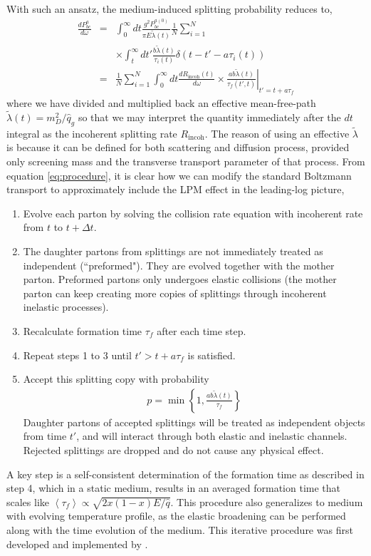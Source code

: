 \documentclass[aps, prc, reprint, amsmath, groupedaddress, nofootinbib]{revtex4-1}
\begin{document}
With such an ansatz, the medium-induced splitting probability reduces to,
\begin{eqnarray}
\nonumber
\frac{dP^{a}_{bc}}{d\omega} &=& \int_0^\infty dt \frac{g^2 P_{bc}^{a(0)}}{\pi E\tilde{\lambda}(t)} \frac{1}{N}\sum_{i=1}^N\\\nonumber
&&\times \int_t^\infty dt' \frac{b \tilde{\lambda}(t)}{\tau_i(t)} \delta(t-t'- a \tau_i(t)) \\
&=& \frac{1}{N}\sum_{i=1}^N\int_0^\infty dt \frac{dR_{\textrm{incoh}}(t)}{d\omega} \times \left.\frac{ab\tilde{\lambda}(t)}{\tau_f(t',t)}\right|_{t'=t+a\tau_f}
\label{eq:procedure}
\end{eqnarray}
where we have divided and multiplied back an effective mean-free-path $\tilde{\lambda}(t) = m_D^2/\hat{q}_g$ so that we may interpret the quantity immediately after the $dt$ integral as the incoherent splitting rate $R_{\textrm{incoh}}$.
The reason of using an effective $\tilde{\lambda}$ is because it can be defined for both scattering and diffusion process, provided only screening mass and the transverse transport parameter of that process.
From equation \ref{eq:procedure}, it is clear how we can modify the standard Boltzmann transport to approximately include the LPM effect in the leading-log picture,
\begin{enumerate}
\item Evolve each parton by solving the collision rate equation with incoherent rate from $t$ to $t+\Delta t$.
\item The daughter partons from splittings are not immediately treated as independent (``preformed"). They are evolved together with the mother parton. Preformed partons only undergoes elastic collisions (the mother parton can keep creating more copies of splittings through incoherent inelastic processes).
\item Recalculate formation time $\tau_f$ after each time step.
\item Repeat steps 1 to 3 until $t' > t + a\tau_f$ is satisfied. 
\item Accept this splitting copy with probability 
\begin{eqnarray}
p = \min\left\{1, \frac{ab\tilde{\lambda}(t)}{\tau_f}\right\}
\label{eq:rejection}
\end{eqnarray}
Daughter partons of accepted splittings will be treated as independent objects from time $t'$, and will interact through both elastic and inelastic channels.
Rejected splittings are dropped and do not cause any physical effect.
\end{enumerate} 
A key step is a self-consistent determination of the formation time as described in step 4, which in a static medium, results in an averaged formation time  that scales like $\left\langle\tau_f\right\rangle \propto \sqrt{2x(1-x)E/\hat{q}}$.
This procedure also generalizes to medium with evolving temperature profile, as the elastic broadening can be performed along with the time evolution of the medium.
This iterative procedure was first developed and implemented by \cite{Zapp:2011ya}.
\end{document}
